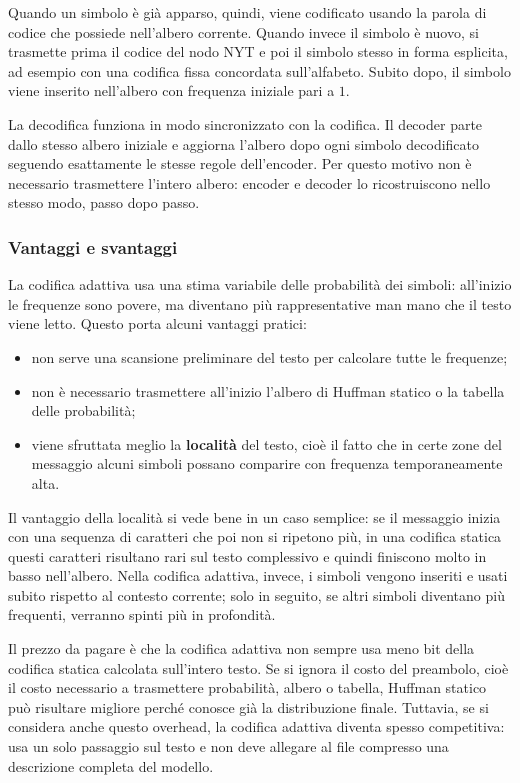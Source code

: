 \documentclass{article}
\theoremstyle{definition}
\numberwithin{equation}{section}
\begin{document}
Quando un simbolo è già apparso, quindi, viene codificato usando la parola di codice che possiede nell'albero corrente. Quando invece il simbolo è nuovo, si trasmette prima il codice del nodo NYT e poi il simbolo stesso in forma esplicita, ad esempio con una codifica fissa concordata sull'alfabeto. Subito dopo, il simbolo viene inserito nell'albero con frequenza iniziale pari a $1$.

La decodifica funziona in modo sincronizzato con la codifica. Il decoder parte dallo stesso albero iniziale e aggiorna l'albero dopo ogni simbolo decodificato seguendo esattamente le stesse regole dell'encoder. Per questo motivo non è necessario trasmettere l'intero albero: encoder e decoder lo ricostruiscono nello stesso modo, passo dopo passo.

\subsubsection{Vantaggi e svantaggi}
La codifica adattiva usa una stima variabile delle probabilità dei simboli: all'inizio le frequenze sono povere, ma diventano più rappresentative man mano che il testo viene letto. Questo porta alcuni vantaggi pratici:
\begin{itemize}
    \item non serve una scansione preliminare del testo per calcolare tutte le frequenze;
    \item non è necessario trasmettere all'inizio l'albero di Huffman statico o la tabella delle probabilità;
    \item viene sfruttata meglio la \textbf{località} del testo, cioè il fatto che in certe zone del messaggio alcuni simboli possano comparire con frequenza temporaneamente alta.
\end{itemize}

Il vantaggio della località si vede bene in un caso semplice: se il messaggio inizia con una sequenza di caratteri che poi non si ripetono più, in una codifica statica questi caratteri risultano rari sul testo complessivo e quindi finiscono molto in basso nell'albero. Nella codifica adattiva, invece, i simboli vengono inseriti e usati subito rispetto al contesto corrente; solo in seguito, se altri simboli diventano più frequenti, verranno spinti più in profondità.

Il prezzo da pagare è che la codifica adattiva non sempre usa meno bit della codifica statica calcolata sull'intero testo. Se si ignora il costo del preambolo, cioè il costo necessario a trasmettere probabilità, albero o tabella, Huffman statico può risultare migliore perché conosce già la distribuzione finale. Tuttavia, se si considera anche questo overhead, la codifica adattiva diventa spesso competitiva: usa un solo passaggio sul testo e non deve allegare al file compresso una descrizione completa del modello.
\end{document}
